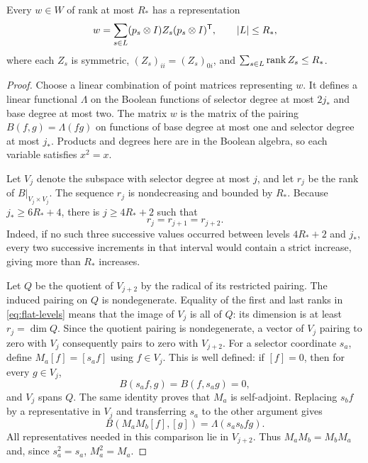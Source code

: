 \begin{lemma}\label{lem:label-support}
Every $w\in W$ of rank at most $R_*$ has a representation
\begin{equation}\label{eq:label-decomposition}
 w=\sum_{s\in L}(p_s\otimes I)Z_s(p_s\otimes I)^{\mathsf T},
 \qquad |L|\le R_*,
\end{equation}
where each $Z_s$ is symmetric, $(Z_s)_{ii}=(Z_s)_{0i}$, and
$\sum_{s\in L}\operatorname{rank} Z_s\le R_*$.
\end{lemma}
\begin{proof}
Choose a linear combination of point matrices representing $w$.
It defines a linear functional $\Lambda$ on the Boolean functions
of selector degree at most $2j_*$ and base degree at most two.
The matrix $w$ is the matrix of the pairing
$B(f,g)=\Lambda(fg)$ on functions of base degree at most one and
selector degree at most $j_*$.  Products and degrees here are in
the Boolean algebra, so each variable satisfies $x^2=x$.

Let $V_j$ denote the subspace with selector degree at most $j$,
and let $r_j$ be the rank of $B|_{V_j\times V_j}$.  The sequence
$r_j$ is nondecreasing and bounded by $R_*$.  Because
$j_*\ge 6R_*+4$, there is $j\ge4R_*+2$ such that
\begin{equation}\label{eq:flat-levels}
 r_j=r_{j+1}=r_{j+2}.
\end{equation}
Indeed, if no such three successive values occurred between
levels $4R_*+2$ and $j_*$, every two successive increments in
that interval would contain a strict increase, giving more than
$R_*$ increases.

Let $Q$ be the quotient of $V_{j+2}$ by the radical of its
restricted pairing.  The induced pairing on $Q$ is nondegenerate.
Equality of the first and last ranks in \eqref{eq:flat-levels}
means that the image of $V_j$ is all of $Q$: its dimension is at
least $r_j=\dim Q$.  Since the quotient pairing is nondegenerate,
a vector of $V_j$ pairing to zero with $V_j$ consequently pairs
to zero with $V_{j+2}$.
For a selector coordinate $s_a$, define $M_a[f]=[s_a f]$ using
$f\in V_j$.  This is well defined: if $[f]=0$, then for every
$g\in V_j$,
\[
 B(s_a f,g)=B(f,s_a g)=0,
\]
and $V_j$ spans $Q$.  The same identity proves that $M_a$ is
self-adjoint.  Replacing $s_bf$ by a representative in $V_j$ and
transferring $s_a$ to the other argument gives
\[
 B(M_aM_b[f],[g])=\Lambda(s_as_bfg).
\]
All representatives needed in this comparison lie in $V_{j+2}$.
Thus $M_aM_b=M_bM_a$ and, since $s_a^2=s_a$, $M_a^2=M_a$.


\end{proof}
